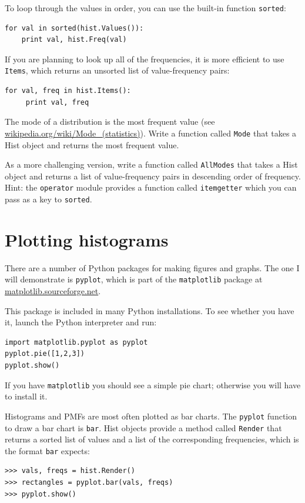 \documentclass[12pt]{book}
\begin{document}
To loop through the values in order, you can use the built-in function
{\tt sorted}:
%
\begin{verbatim}
for val in sorted(hist.Values()):
    print val, hist.Freq(val)
\end{verbatim}

If you are planning to look up all of the frequencies, it is more
efficient to use {\tt Items}, which returns an unsorted list of
value-frequency pairs:
%
\begin{verbatim}
for val, freq in hist.Items():
     print val, freq
\end{verbatim}

\begin{exercise}
The mode of a distribution is the most frequent value (see
\url{wikipedia.org/wiki/Mode_(statistics)}).  Write a function called
    {\tt Mode} that takes a Hist object and returns the most frequent
    value.

As a more challenging version, write a function called {\tt AllModes}
that takes a Hist object and returns a list of value-frequency
pairs in descending order of frequency.  Hint: the {\tt operator}
module provides a function called {\tt itemgetter} which you can
pass as a key to {\tt sorted}.

\end{exercise}


\section{Plotting histograms}

There are a number of Python packages for making figures and graphs.
The one I will demonstrate is {\tt pyplot}, which is part of
the {\tt matplotlib} package at \url{matplotlib.sourceforge.net}.

This package is included in many Python installations.  To see whether
you have it, launch the Python interpreter and run:
%
\begin{verbatim}
import matplotlib.pyplot as pyplot
pyplot.pie([1,2,3])
pyplot.show()
\end{verbatim}

If you have {\tt matplotlib} you should see a simple pie chart;
otherwise you will have to install it.

Histograms and PMFs are most often plotted as bar charts.  The
{\tt pyplot} function to draw a bar chart is {\tt bar}.  Hist
objects provide a method called {\tt Render} that returns a sorted
list of values and a list of the corresponding frequencies, which
is the format {\tt bar} expects:
%
\begin{verbatim}
>>> vals, freqs = hist.Render()
>>> rectangles = pyplot.bar(vals, freqs)
>>> pyplot.show()
\end{verbatim}
\end{document}
